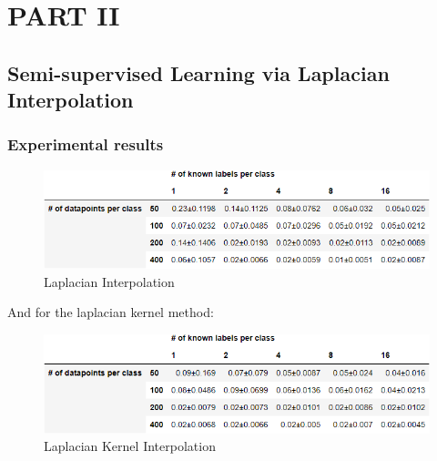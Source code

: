 \documentclass[12pt]{article}
\begin{document}
\newpage
\section{PART II}
\subsection{Semi-supervised Learning via Laplacian Interpolation}

\subsubsection{Experimental results}

    \begin{figure}[h]
    \centering
    \includegraphics[scale=0.5]{outputs/part2/laplacian_interpolation_report.png}
    \caption{Laplacian Interpolation}
    \label{fig:12}
    \end{figure}

And for the laplacian kernel method:
    \begin{figure}[h]
    \centering
    \includegraphics[scale=0.5]{outputs/part2/laplacian_kernel_interpolation_report.png}
    \caption{Laplacian Kernel Interpolation}
    \label{fig:13}
    \end{figure}
\end{document}
